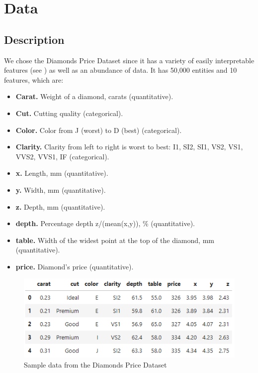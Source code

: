 \documentclass[12pt,a4paper]{article}
\begin{document}
	
	\maketitle
	
	\tableofcontents
	
	\section{Data}
	
	\subsection{Description}
	
	We chose the Diamonds Price Dataset since it has a variety of easily interpretable features (see ) as well as an abundance of data. It has 50,000 entities and 10 features, which are:
	\begin{itemize}
		\itemsep 0pt
		\item \textbf{Carat.} Weight of a diamond, carats (quantitative).
		\item \textbf{Cut.}	Cutting quality (categorical).
		\item \textbf{Color.} Color from J (worst) to D (best) (categorical).
		\item \textbf{Clarity.} Clarity from left to right is worst to best: I1, SI2, SI1, VS2, VS1, VVS2, VVS1, IF (categorical).
		\item \textbf{x.} Length, mm (quantitative).
		\item \textbf{y.} Width, mm (quantitative).
		\item \textbf{z.} Depth, mm (quantitative).
		\item \textbf{depth.} Percentage depth z/(mean(x,y)), \% (quantitative).
		\item \textbf{table.} Width of the widest point at the top of the diamond, mm (quantitative).
		\item \textbf{price.} Diamond's price (quantitative).
	\end{itemize}
	
	\begin{figure}[hbtp]
		\centering
		\includegraphics[width=.75\textwidth]{media/sample.png}
		\caption{Sample data from the Diamonds Price Dataset}
		\label{fig:sample}
	\end{figure}
	
\end{document}
